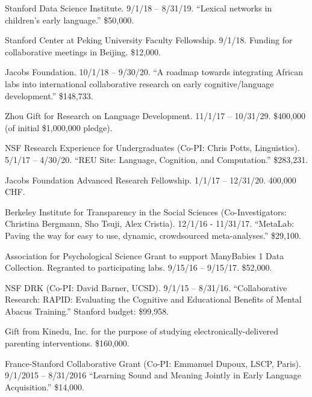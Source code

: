 \documentclass{article}
\renewenvironment{itemize}{
\begin{list}{}{
  \setlength{\leftmargin}{1.5em}
  }
  }{
\end{list}
}
\begin{document}
\begin{itemize}
  \item Stanford Data Science Institute. 9/1/18 -- 8/31/19. ``Lexical networks in children's early language.'' \$50,000.

  \item Stanford Center at Peking University Faculty Fellowship. 9/1/18. Funding for collaborative meetings in Beijing. \$12,000.

  \item Jacobs Foundation. 10/1/18 -- 9/30/20. ``A roadmap towards integrating African labs into international collaborative research on early cognitive/language development.'' \$148,733.

  \item Zhou Gift for Research on Language Development. 11/1/17 -- 10/31/29. \$400,000 (of initial \$1,000,000 pledge).

  \item NSF Research Experience for Undergraduates (Co-PI: Chris Potts, Linguistics). 5/1/17 -- 4/30/20. ``REU Site: Language, Cognition, and Computation.'' \$283,231.

  \item Jacobs Foundation Advanced Research Fellowship. 1/1/17 -- 12/31/20. 400,000 CHF.

  \item Berkeley Institute for Transparency in the Social Sciences (Co-Investigators: Christina Bergmann, Sho Tsuji, Alex Cristia). 12/1/16 - 11/31/17. ``MetaLab: Paving the way for easy to use, dynamic, crowdsourced meta-analyses.'' \$29,100.

  \item Association for Psychological Science Grant to support ManyBabies 1 Data Collection. Regranted to participating labs. 9/15/16 -- 9/15/17. \$52,000.

  \item NSF DRK (Co-PI: David Barner, UCSD). 9/1/15 -- 8/31/16. ``Collaborative Research: RAPID: Evaluating the Cognitive and Educational Benefits of Mental Abacus Training.'' Stanford budget: \$99,958.

  \item Gift from Kinedu, Inc. for the purpose of studying electronically-delivered parenting interventions. \$160,000.

  \item France-Stanford Collaborative Grant (Co-PI: Emmanuel Dupoux, LSCP, Paris). 9/1/2015 -- 8/31/2016 ``Learning Sound and Meaning Jointly in Early Language Acquisition.'' \$14,000.


\end{itemize}
\end{document}
